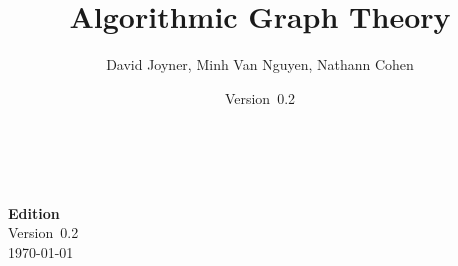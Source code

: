 \documentclass[a4paper,twoside,12pt]{book}
\newcommand{\documentEdition}{0.2}
\begin{document}
\title{\Huge{\bf{Algorithmic Graph Theory}}}
\author{\Large{David Joyner, Minh Van Nguyen, Nathann Cohen}}
\date{Version~\documentEdition}
\maketitle



{\thispagestyle{empty}
   \\\\
  \textbf{Edition} \\
  Version~\documentEdition \\
  \today
}

\frontmatter
\setcounter{tocdepth}{1}
\tableofcontents

\listofalgorithms
{}
\listoffigures
{}
\listoftables
{}

\mainmatter














\appendix



\backmatter


\printindex
\end{document}
